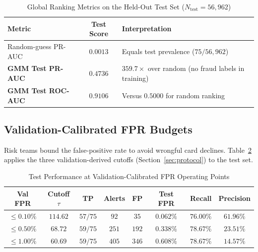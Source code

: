 \documentclass[11pt, a4paper]{article}
\begin{document}
\begin{table}[h!]
\centering
\caption{Global Ranking Metrics on the Held-Out Test Set ($N_{\text{test}} = 56{,}962$)}
\vspace{0.2cm}
\renewcommand{\arraystretch}{1.25}
\begin{tabular}{lcl}
\toprule
\rowcolor{tableheader}
\textbf{Metric} & \textbf{Test Score} & \textbf{Interpretation} \\
\midrule
Random-guess PR-AUC & $0.0013$ & Equals test prevalence ($75/56{,}962$) \\
\rowcolor{rowalt}
\textbf{GMM Test PR-AUC} & $\mathbf{0.4736}$ & $359.7\times$ over random (no fraud labels in training) \\
\textbf{GMM Test ROC-AUC} & $\mathbf{0.9106}$ & Versus $0.5000$ for random ranking \\
\bottomrule
\end{tabular}
\label{tab:global_metrics}
\end{table}

\subsection{Validation-Calibrated FPR Budgets}
Risk teams bound the false-positive rate to avoid wrongful card declines. Table~\ref{tab:fpr_budgets} applies the three validation-derived cutoffs (Section~\ref{sec:protocol}) to the test set.

\begin{table}[h!]
\centering
\caption{Test Performance at Validation-Calibrated FPR Operating Points}
\vspace{0.2cm}
\renewcommand{\arraystretch}{1.25}
\small
\setlength{\tabcolsep}{4pt}
\begin{tabular}{cccccccc}
\toprule
\rowcolor{tableheader}
\textbf{Val FPR} & \textbf{Cutoff $\tau$} & \textbf{TP} & \textbf{Alerts} & \textbf{FP} & \textbf{Test FPR} & \textbf{Recall} & \textbf{Precision} \\
\midrule
$\mathbf{\le 0.10\%}$ & $114.62$ & $57/75$ & $92$ & $35$ & $0.062\%$ & $\mathbf{76.00\%}$ & $\mathbf{61.96\%}$ \\
\rowcolor{rowalt}
$\le 0.50\%$ & $68.72$ & $59/75$ & $251$ & $192$ & $0.338\%$ & $78.67\%$ & $23.51\%$ \\
$\le 1.00\%$ & $60.69$ & $59/75$ & $405$ & $346$ & $0.608\%$ & $78.67\%$ & $14.57\%$ \\
\bottomrule
\end{tabular}
\label{tab:fpr_budgets}
\end{table}
\end{document}
